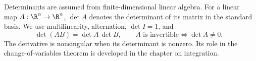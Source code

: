 Determinants are assumed from finite-dimensional linear algebra. For a linear
map $A:\R^{n}\to\R^{n}$, $\det A$ denotes the determinant of its matrix in the
standard basis. We use multilinearity, alternation, $\det I=1$, and
\[
  \det(AB)=\det A\,\det B,
  \qquad A\text{ is invertible}\iff\det A\neq 0.
\]
The derivative is nonsingular when its determinant is nonzero.
Its role in the change-of-variables theorem is developed in the chapter on integration.
